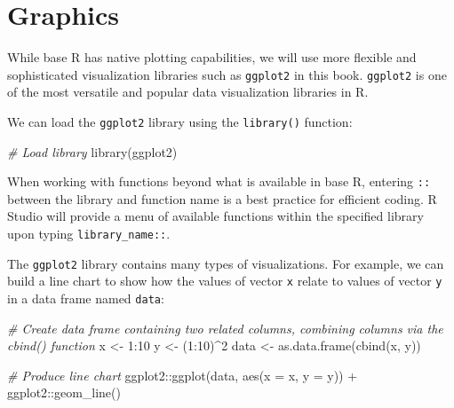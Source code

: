 \documentclass[
]{book}
\newenvironment{Shaded}{\begin{snugshade}}{\end{snugshade}}
\newcommand{\AttributeTok}[1]{\textcolor[rgb]{0.77,0.63,0.00}{#1}}
\newcommand{\CommentTok}[1]{\textcolor[rgb]{0.56,0.35,0.01}{\textit{#1}}}
\newcommand{\DecValTok}[1]{\textcolor[rgb]{0.00,0.00,0.81}{#1}}
\newcommand{\FunctionTok}[1]{\textcolor[rgb]{0.00,0.00,0.00}{#1}}
\newcommand{\NormalTok}[1]{#1}
\newcommand{\OtherTok}[1]{\textcolor[rgb]{0.56,0.35,0.01}{#1}}
\newcommand{\SpecialCharTok}[1]{\textcolor[rgb]{0.00,0.00,0.00}{#1}}
\begin{document}
\hypertarget{graphics}{%
\section{Graphics}\label{graphics}}

While base R has native plotting capabilities, we will use more flexible and sophisticated visualization libraries such as \texttt{ggplot2} in this book. \texttt{ggplot2} is one of the most versatile and popular data visualization libraries in R.

We can load the \texttt{ggplot2} library using the \texttt{library()} function:

\begin{Shaded}
\begin{Highlighting}[]
\CommentTok{\# Load library}
\FunctionTok{library}\NormalTok{(ggplot2)}
\end{Highlighting}
\end{Shaded}

When working with functions beyond what is available in base R, entering \texttt{::} between the library and function name is a best practice for efficient coding. R Studio will provide a menu of available functions within the specified library upon typing \texttt{library\_name::}.

The \texttt{ggplot2} library contains many types of visualizations. For example, we can build a line chart to show how the values of vector \texttt{x} relate to values of vector \texttt{y} in a data frame named \texttt{data}:

\begin{Shaded}
\begin{Highlighting}[]
\CommentTok{\# Create data frame containing two related columns, combining columns via the cbind() function}
\NormalTok{x }\OtherTok{\textless{}{-}} \DecValTok{1}\SpecialCharTok{:}\DecValTok{10}
\NormalTok{y }\OtherTok{\textless{}{-}}\NormalTok{ (}\DecValTok{1}\SpecialCharTok{:}\DecValTok{10}\NormalTok{)}\SpecialCharTok{\^{}}\DecValTok{2}
\NormalTok{data }\OtherTok{\textless{}{-}} \FunctionTok{as.data.frame}\NormalTok{(}\FunctionTok{cbind}\NormalTok{(x, y))}

\CommentTok{\# Produce line chart}
\NormalTok{ggplot2}\SpecialCharTok{::}\FunctionTok{ggplot}\NormalTok{(data, }\FunctionTok{aes}\NormalTok{(}\AttributeTok{x =}\NormalTok{ x, }\AttributeTok{y =}\NormalTok{ y)) }\SpecialCharTok{+}
\NormalTok{ggplot2}\SpecialCharTok{::}\FunctionTok{geom\_line}\NormalTok{()}
\end{Highlighting}
\end{Shaded}
\end{document}

